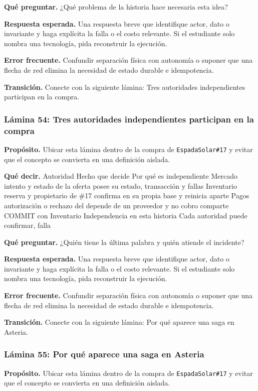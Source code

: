 \documentclass[variant=docente,cover=institutional,mode=screen]{ua-engineering-v6-article}
\begin{document}
\textbf{Qué preguntar.} ¿Qué problema de la historia hace necesaria esta idea?

\textbf{Respuesta esperada.} Una respuesta breve que identifique actor, dato o invariante y haga explícita la falla o el costo relevante. Si el estudiante solo nombra una tecnología, pida reconstruir la ejecución.

\textbf{Error frecuente.} Confundir separación física con autonomía o suponer que una flecha de red elimina la necesidad de estado durable e idempotencia.

\textbf{Transición.} Conecte con la siguiente lámina: Tres autoridades independientes participan en la compra.

\subsubsection*{Lámina 54: Tres autoridades independientes participan en la compra}
\textbf{Propósito.} Ubicar esta lámina dentro de la compra de \texttt{EspadaSolar\#17} y evitar que el concepto se convierta en una definición aislada.

\textbf{Qué decir.} Autoridad Hecho que decide Por qué es independiente Mercado intento y estado de la oferta posee su estado, transacción y fallas Inventario reserva y propietario de \#17 confirma en su propia base y reinicia aparte Pagos autorización o rechazo del depende de un proveedor y no cobro comparte COMMIT con Inventario Independencia en esta historia Cada autoridad puede confirmar, falla

\textbf{Qué preguntar.} ¿Quién tiene la última palabra y quién atiende el incidente?

\textbf{Respuesta esperada.} Una respuesta breve que identifique actor, dato o invariante y haga explícita la falla o el costo relevante. Si el estudiante solo nombra una tecnología, pida reconstruir la ejecución.

\textbf{Error frecuente.} Confundir separación física con autonomía o suponer que una flecha de red elimina la necesidad de estado durable e idempotencia.

\textbf{Transición.} Conecte con la siguiente lámina: Por qué aparece una saga en Asteria.

\subsubsection*{Lámina 55: Por qué aparece una saga en Asteria}
\textbf{Propósito.} Ubicar esta lámina dentro de la compra de \texttt{EspadaSolar\#17} y evitar que el concepto se convierta en una definición aislada.
\end{document}
